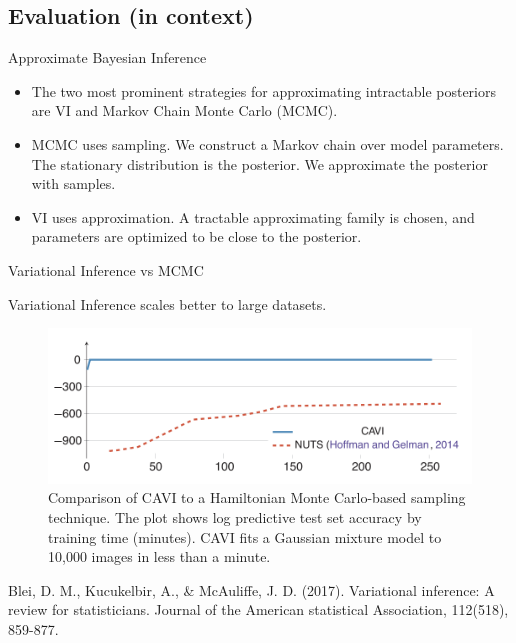 \documentclass[10pt]{beamer}
\begin{document}
\subsection{Evaluation (in context)}


\begin{frame}{Approximate Bayesian Inference}

\begin{itemize}
\item The two most prominent strategies for approximating intractable posteriors are VI and Markov Chain Monte Carlo (MCMC). 
\item MCMC  uses \alert{sampling}.  We construct a Markov chain over model parameters.  The stationary distribution is the posterior.  We approximate the posterior with samples.
\item VI uses \alert{approximation}.  A tractable approximating family is chosen, and parameters are optimized to be close to the posterior.
\end{itemize}

\end{frame}

\begin{frame}{Variational Inference vs MCMC}

Variational Inference scales better to large datasets.

\begin{figure}
\includegraphics[width=\textwidth]{images/CAVI_vs_HamiltonianMCMC}
\caption{ Comparison of CAVI to a Hamiltonian Monte Carlo-based sampling technique.  The plot shows log predictive test set accuracy by training time (minutes).  CAVI fits a Gaussian mixture model to 10,000 images in less than a minute.}
\end{figure}
\vfill
\tiny Blei, D. M., Kucukelbir, A., \& McAuliffe, J. D. (2017). Variational inference: A review for statisticians. Journal of the American statistical Association, 112(518), 859-877.
\end{frame}
\end{document}
